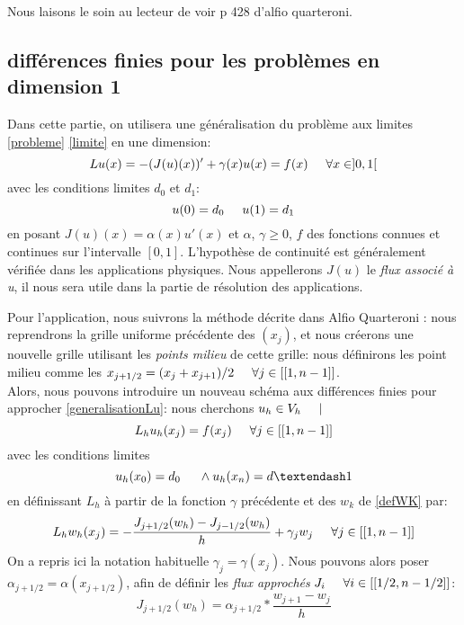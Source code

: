 \documentclass[12pt]{article}
\newcommand{\espace}{\hspace{5mm}}
\begin{document}
Nous laisons le soin au lecteur de voir p 428 d'alfio quarteroni.

\subsection{différences finies pour les problèmes en dimension 1}
Dans cette partie, on utilisera une généralisation du problème aux limites \eqref{probleme} \eqref{limite} en une dimension:
\begin{equation} \label{generalisationLu}
Lu(x) = -(J(u)(x))' + \gamma (x) u(x)  = f(x) \espace \forall x \in ]0,1[
\end{equation}
avec les conditions limites $d_0$ et $d_1$:
\begin{equation}
u(0) = d_0 \espace u(1) = d_1
\end{equation}
en posant $J(u)(x) = \alpha(x) u'(x)$ et $\alpha$, $\gamma \ge 0$, $f$ des fonctions connues et continues sur l'intervalle $[0,1]$. L'hypothèse de continuité est généralement vérifiée dans les applications physiques.  Nous appellerons $J(u)$ le \emph{flux associé à u}, il nous sera utile dans la partie de résolution des applications.

Pour l'application, nous suivrons la méthode décrite dans Alfio Quarteroni : nous reprendrons la grille uniforme précédente des $(x_j)$, et nous créerons une nouvelle grille utilisant les \emph{points milieu} de cette grille: nous définirons les point milieu comme les $x_{j+1/2} = (x_j + x_{j+1}) /2 \espace \forall j \in [[1,n-1]]$. \\
Alors, nous pouvons introduire un nouveau schéma aux différences finies pour approcher \eqref{generalisationLu}: nous cherchons $u_h \in V_h \espace |$
\begin{equation} \label{miseEnFormeTemporaire}
L_h u_h (x_j) = f(x_j) \espace \forall j \in [[1,n-1]]
\end{equation}
avec les conditions limites
\begin{equation}
u_h(x_0) = d_0 \espace \wedge u_h(x_n) = d–1
\end{equation}
en définissant $L_h$ à partir de la fonction $\gamma$ précédente et des $w_k$ de \eqref{defWK} par:
\begin{equation} \label{katto}
	L_h w_h (x_j) = - \frac{J_{j + 1/2}(w_h) - J_{j - 1/2}(w_h)}{h} + \gamma_j w_j  \espace \forall j \in [[1,n-1]]
\end{equation}
On a repris ici la notation habituelle $\gamma_j = \gamma(x_j)$. Nous pouvons alors poser $\alpha_{j+1/2} = \alpha(x_{j+1/2})$, afin de définir les \emph{flux approchés} $J_i \espace \forall i \in [[1/2,n-1/2]]$:
\begin{equation}
J_{j+1/2} (w_h) = \alpha_{j+1/2} * \frac{w_{j+1} - w_j}{h}
\end{equation}
\end{document}
